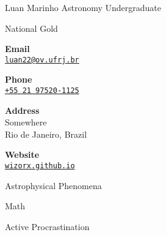 \documentclass{article}
\begin{document}
\begin{cv}[avatar]{Luan Marinho }{Astronomy Undergraduate}
\begin{cvevent}[1997]
    National Gold
\end{cvevent}


\cvsidebar %


\begin{cvitem}[Envelope][0.6]
    \textbf{Email}\\
    \href{mailto:james.bond@mi6.gov}{\texttt{luan22@ov.ufrj.br}}
\end{cvitem}

\cvseparator[3]
\begin{cvitem}[Phone][0.6]
    \textbf{Phone}\\
    \href{tel:+5521975201125}{\texttt{+55 21 97520-1125}}
\end{cvitem}

\cvseparator[3]
\begin{cvitem}[Home][0.6]
    \textbf{Address}\\
    Somewhere\\ Rio de Janeiro, Brazil
\end{cvitem}

\cvseparator[3]
\begin{cvitem}[Globe][0.6]
    \textbf{Website}\\
    \href{https://wizorx.github.io}{\texttt{wizorx.github.io}}
\end{cvitem}





\begin{cvitem}
    Astrophysical Phenomena
\end{cvitem}

\cvseparator
\begin{cvitem}
    Math
\end{cvitem}

\cvseparator
\begin{cvitem}
    Active Procrastination
\end{cvitem}


\end{cv}
\end{document}

